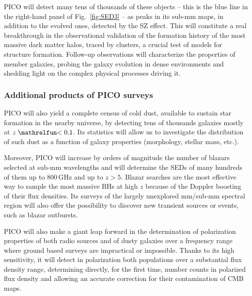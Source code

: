 \documentclass[PICOReport.tex]{subfiles}
\begin{document}
PICO will detect many tens of thousands of these objects -- this is the blue line in the right-hand panel of Fig.~\ref{fig:SED3} -- as peaks in its sub-mm maps, in addition to the evolved ones, detected by the SZ effect. This will constitute a real breakthrough in the observational validation of the formation history of the most massive dark matter halos, traced by clusters, a crucial test of models for structure formation. Follow-up observations will characterize the properties of member galaxies, probing the galaxy evolution in dense environments and shedding light on the complex physical processes driving it.

\subsubsection{Additional products of PICO surveys}

PICO will also yield a complete census of cold dust, available to sustain star formation in the nearby universe, by detecting tens of thousands galaxies mostly at $z\simlt 0.1$. Its statistics will allow us to investigate the distribution of such dust as a function of galaxy properties (morphology, stellar mass, etc.).

Moreover, PICO will increase by orders of magnitude the number of blazars selected at sub-mm wavelengths and will determine the SEDs of many hundreds of them up to 800\,GHz and up to $z> 5$. Blazar searches are the most effective way to sample the most massive BHs at high $z$ because of the Doppler boosting of their flux densities. Its surveys of the largely unexplored mm/sub-mm spectral region will also offer the possibility to discover new transient sources \cite{Metzger2015} or events, such as blazar outbursts.

PICO will also make a giant leap forward in the determination of
polarization properties of both radio sources and of dusty galaxies over a frequency range where ground based surveys are impractical or impossible. Thanks to its high sensitivity, it will detect in polarization both populations over a substantial flux density range, determining directly, for the first time, number counts in polarized flux density and allowing an accurate correction for their contamination of CMB maps.
\end{document}
